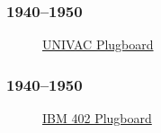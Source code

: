 \documentclass[ignorenonframetext, hyperref=unicode]{beamer}
\begin{document}
\begin{frame}
\frametitle{1940--1950}
\begin{figure}[h]
\center
{}
\caption{\href{http://en.wikipedia.org/wiki/Plug-board}{UNIVAC Plugboard}}
\end{figure}
\end{frame}

\begin{frame}
\frametitle{1940--1950}
\begin{figure}[h]
\center
{}
\caption{\href{http://en.wikipedia.org/wiki/Plug-board}{IBM 402 Plugboard}}
\end{figure}
\end{frame}
\end{document}
